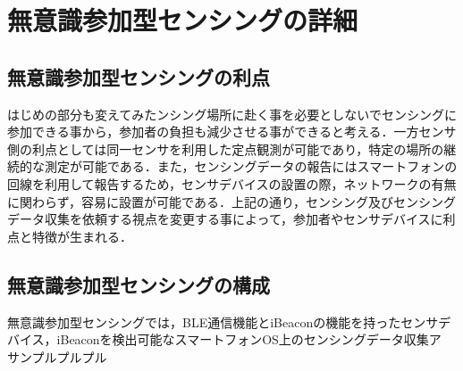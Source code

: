 \documentclass[submit,techrep]{ipsj}
\begin{document}

\section{無意識参加型センシングの詳細}


\subsection{無意識参加型センシングの利点}
はじめの部分も変えてみたンシング場所に赴く事を必要としないでセンシングに参加できる事から，参加者の負担も減少させる事ができると考える．一方センサ側の利点としては同一センサを利用した定点観測が可能であり，特定の場所の継続的な測定が可能である．また，センシングデータの報告にはスマートフォンの回線を利用して報告するため，センサデバイスの設置の際，ネットワークの有無に関わらず，容易に設置が可能である．上記の通り，センシング及びセンシングデータ収集を依頼する視点を変更する事によって，参加者やセンサデバイスに利点と特徴が生まれる．


\subsection{無意識参加型センシングの構成}
無意識参加型センシングでは，BLE通信機能とiBeaconの機能を持ったセンサデバイス，iBeaconを検出可能なスマートフォンOS上のセンシングデータ収集ア
サンプルプルプル\\
\end{document}
